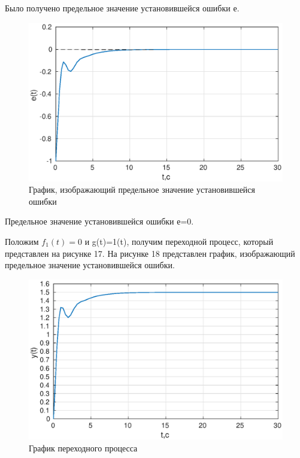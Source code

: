 \documentclass[12pt,a4paper]{article}
\begin{document}
Было получено предельное значение установившейся ошибки е.

\begin{figure}[H]
\centering
\includegraphics[width=\textwidth]{1/3_2e(t).eps}
\caption{График, изображающий предельное значение установившейся ошибки}
\end{figure}
Предельное значение установившейся ошибки е=0.

Положим $f_{1}(t)=0$ и g(t)=1(t), получим переходной процесс, который представлен на рисунке 17.
На рисунке 18 представлен график, изображающий предельное значение установившейся ошибки.

\begin{figure}[H]
\centering
\includegraphics[width=\textwidth]{1/3_3y(t).eps}
\caption{График переходного процесса}
\end{figure}
\end{document}
